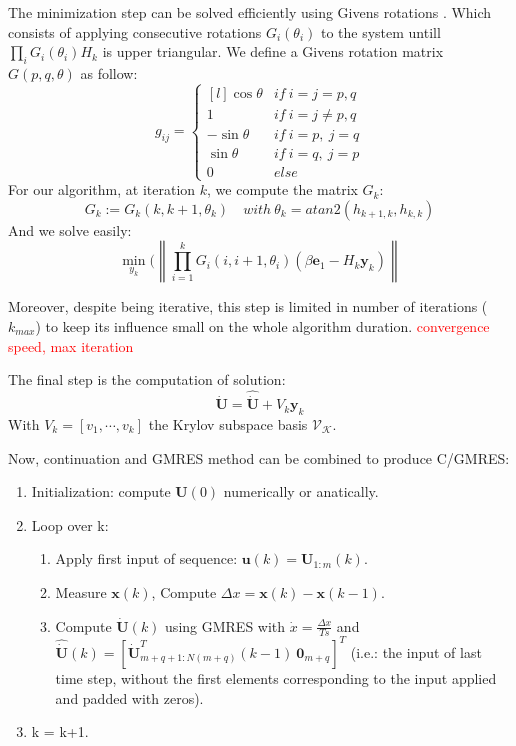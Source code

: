 \documentclass[a4paper, 12pt]{report}
\newcommand\norm[1]{\left\lVert#1\right\rVert}
\begin{document}
The minimization step can be solved efficiently using Givens rotations \cite{Bjorck1996}. Which consists of applying consecutive rotations $G_i(\theta_i)$ to the system untill $\prod_i G_i(\theta_i) H_k$ is upper triangular.
We define a Givens rotation matrix $G(p, q, \theta)$ as follow:
\[ g_{ij} = \left\{ \begin{matrix*}[l] \cos{\theta} &  if\ i = j = p, q \\ 1 & if\ i = j \neq p, q  \\  -\sin{\theta} &  if\ i = p,\ j = q \\ \sin{\theta} &  if\ i = q,\ j = p \\ 0 & else \end{matrix*} \right.\]
For our algorithm, at iteration $k$, we compute the matrix $G_k$:
\[ G_k := G_k(k, k+1, \theta_k) \quad with\ \theta_k = atan2(h_{k+1, k}, h_{k,k})\]
And we solve easily:
\[ \min\limits_{y_k}(\norm{\prod\limits_{i=1}^k G_i(i, i+1, \theta_i) (\beta \boldsymbol{e}_1 - H_k \boldsymbol{y}_k)} \]

Moreover, despite being iterative, this step is limited in number of iterations ($k_{max}$) to keep its influence small on the whole algorithm duration. \textcolor{red}{convergence speed, max iteration}

The final step is the computation of solution:
\[ \boldsymbol{\dot U} = \boldsymbol{\hat{ \dot U}} + V_k \boldsymbol{y}_k \]
With $V_k = [v_1, \cdots, v_k]$ the Krylov subspace basis $\mathcal{V}_\mathcal{K}$.

Now, continuation and GMRES method can be combined to produce C/GMRES:
\begin{enumerate}
\item Initialization: compute $\boldsymbol{U}(0)$ numerically or anatically.
\item Loop over k:
\begin{enumerate}
\item Apply first input of sequence: $\boldsymbol{u}(k) = \boldsymbol{U}_{1:m}(k)$.
\item Measure $\boldsymbol{x}(k)$, Compute $\Delta x = \boldsymbol{x}(k) - \boldsymbol{x}(k-1)$.
\item Compute $\boldsymbol{\dot U}(k)$ using GMRES with $\dot x = \frac{\Delta x}{Ts}$ and $\boldsymbol{\hat{\dot U}}(k) = [\boldsymbol{\dot U}^T_{m+q+1:N(m+q)}(k-1)\ \boldsymbol{0}_{m+q}]^T $ (i.e.: the input of last time step, without the first elements corresponding to the input applied and padded with zeros).
\end{enumerate}
\item k = k+1.
\end{enumerate}
\end{document}
